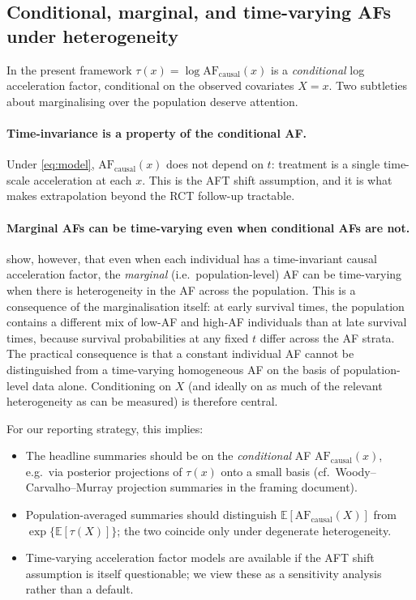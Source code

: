 \documentclass[11pt]{article}
\newcommand{\tauf}{\tau}
\newcommand{\AF}{\mathrm{AF}}
\begin{document}
\subsection{Conditional, marginal, and time-varying AFs under heterogeneity}

In the present framework $\tauf(x) = \log\AF_{\mathrm{causal}}(x)$ is a
\emph{conditional} log acceleration factor, conditional on the observed
covariates $X = x$. Two subtleties about marginalising over the
population deserve attention.

\paragraph{Time-invariance is a property of the conditional AF.}
Under \eqref{eq:model}, $\AF_{\mathrm{causal}}(x)$ does not depend on $t$:
treatment is a single time-scale acceleration at each $x$. This is the
AFT shift assumption, and it is what makes extrapolation beyond the RCT
follow-up tractable.

\paragraph{Marginal AFs can be time-varying even when conditional AFs
are not.}
\citet{Brathovde2024} show, however, that even when each individual has
a time-invariant causal acceleration factor, the \emph{marginal} (i.e.\
population-level) AF can be time-varying when there is heterogeneity in
the AF across the population. This is a consequence of the marginalisation
itself: at early survival times, the population contains a different mix
of low-AF and high-AF individuals than at late survival times, because
survival probabilities at any fixed $t$ differ across the AF strata. The
practical consequence is that a constant individual AF cannot be
distinguished from a time-varying homogeneous AF on the basis of
population-level data alone. Conditioning on $X$ (and ideally on as much
of the relevant heterogeneity as can be measured) is therefore central.

For our reporting strategy, this implies:
\begin{itemize}[leftmargin=*]
  \item The headline summaries should be on the \emph{conditional} AF
        $\AF_{\mathrm{causal}}(x)$, e.g.\ via posterior projections of
        $\tauf(x)$ onto a small basis (cf.\ Woody--Carvalho--Murray
        projection summaries in the framing document).
  \item Population-averaged summaries should distinguish
        $\mathbb{E}[\AF_{\mathrm{causal}}(X)]$ from
        $\exp\{\mathbb{E}[\tauf(X)]\}$; the two coincide only under
        degenerate heterogeneity.
  \item Time-varying acceleration factor models
        \citep{Crowther2023, Pang2021} are available if the AFT shift
        assumption is itself questionable; we view these as a sensitivity
        analysis rather than a default.
\end{itemize}
\end{document}
